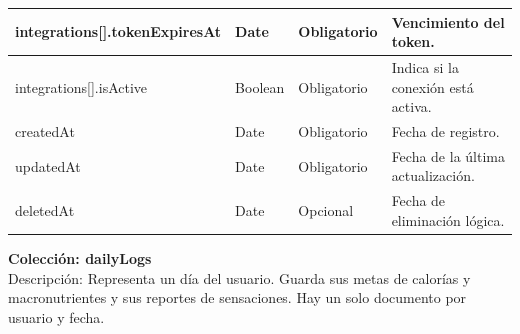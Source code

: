 {\begin{longtable}{|>{\raggedright\arraybackslash}p{4.7cm}|>{\raggedright\arraybackslash}p{1.8cm}|>{\raggedright\arraybackslash}p{2.3cm}|>{\raggedright\arraybackslash}p{5.4cm}|}
    integrations[]\allowbreak .\allowbreak tokenExpiresAt & Date & Obligatorio & Vencimiento del token. \\ \hline
    integrations[]\allowbreak .\allowbreak isActive & Boolean & Obligatorio & Indica si la conexión está activa. \\ \hline
    createdAt & Date & Obligatorio & Fecha de registro. \\ \hline
    updatedAt & Date & Obligatorio & Fecha de la última actualización. \\ \hline
    deletedAt & Date & Opcional & Fecha de eliminación lógica. \\ \hline
\end{longtable}
}
\noindent\textbf{Colección: dailyLogs} \\
Descripción: Representa un día del usuario. Guarda sus metas de calorías y macronutrientes y sus reportes de sensaciones. Hay un solo documento por usuario y fecha.
